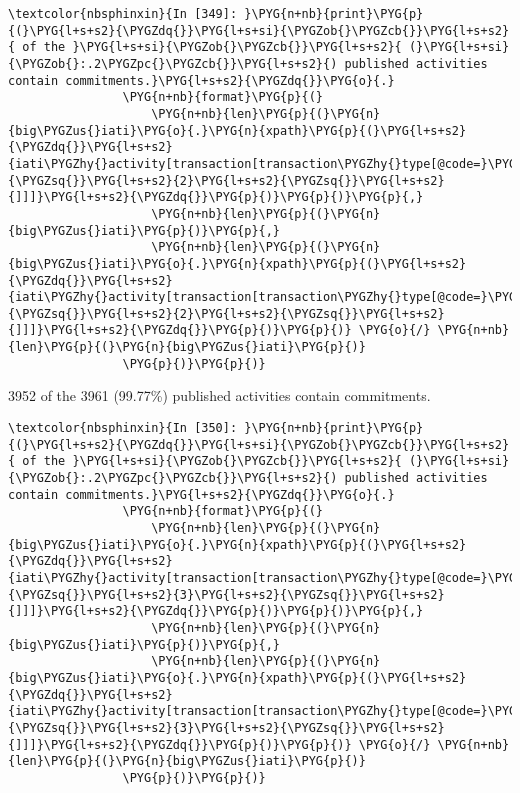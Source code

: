 \documentclass[letterpaper,10pt,english]{sphinxmanual}
\begin{document}
\begin{Verbatim}[commandchars=\\\{\}]
\textcolor{nbsphinxin}{In [349]: }\PYG{n+nb}{print}\PYG{p}{(}\PYG{l+s+s2}{\PYGZdq{}}\PYG{l+s+si}{\PYGZob{}\PYGZcb{}}\PYG{l+s+s2}{ of the }\PYG{l+s+si}{\PYGZob{}\PYGZcb{}}\PYG{l+s+s2}{ (}\PYG{l+s+si}{\PYGZob{}:.2\PYGZpc{}\PYGZcb{}}\PYG{l+s+s2}{) published activities contain commitments.}\PYG{l+s+s2}{\PYGZdq{}}\PYG{o}{.}
                \PYG{n+nb}{format}\PYG{p}{(}
                    \PYG{n+nb}{len}\PYG{p}{(}\PYG{n}{big\PYGZus{}iati}\PYG{o}{.}\PYG{n}{xpath}\PYG{p}{(}\PYG{l+s+s2}{\PYGZdq{}}\PYG{l+s+s2}{iati\PYGZhy{}activity[transaction[transaction\PYGZhy{}type[@code=}\PYG{l+s+s2}{\PYGZsq{}}\PYG{l+s+s2}{2}\PYG{l+s+s2}{\PYGZsq{}}\PYG{l+s+s2}{]]]}\PYG{l+s+s2}{\PYGZdq{}}\PYG{p}{)}\PYG{p}{)}\PYG{p}{,}
                    \PYG{n+nb}{len}\PYG{p}{(}\PYG{n}{big\PYGZus{}iati}\PYG{p}{)}\PYG{p}{,}
                    \PYG{n+nb}{len}\PYG{p}{(}\PYG{n}{big\PYGZus{}iati}\PYG{o}{.}\PYG{n}{xpath}\PYG{p}{(}\PYG{l+s+s2}{\PYGZdq{}}\PYG{l+s+s2}{iati\PYGZhy{}activity[transaction[transaction\PYGZhy{}type[@code=}\PYG{l+s+s2}{\PYGZsq{}}\PYG{l+s+s2}{2}\PYG{l+s+s2}{\PYGZsq{}}\PYG{l+s+s2}{]]]}\PYG{l+s+s2}{\PYGZdq{}}\PYG{p}{)}\PYG{p}{)} \PYG{o}{/} \PYG{n+nb}{len}\PYG{p}{(}\PYG{n}{big\PYGZus{}iati}\PYG{p}{)}
                \PYG{p}{)}\PYG{p}{)}
\end{Verbatim}
%
\begin{OriginalVerbatim}[commandchars=\\\{\}]
3952 of the 3961 (99.77\%) published activities contain commitments.
\end{OriginalVerbatim}
\relax
\begin{Verbatim}[commandchars=\\\{\}]
\textcolor{nbsphinxin}{In [350]: }\PYG{n+nb}{print}\PYG{p}{(}\PYG{l+s+s2}{\PYGZdq{}}\PYG{l+s+si}{\PYGZob{}\PYGZcb{}}\PYG{l+s+s2}{ of the }\PYG{l+s+si}{\PYGZob{}\PYGZcb{}}\PYG{l+s+s2}{ (}\PYG{l+s+si}{\PYGZob{}:.2\PYGZpc{}\PYGZcb{}}\PYG{l+s+s2}{) published activities contain commitments.}\PYG{l+s+s2}{\PYGZdq{}}\PYG{o}{.}
                \PYG{n+nb}{format}\PYG{p}{(}
                    \PYG{n+nb}{len}\PYG{p}{(}\PYG{n}{big\PYGZus{}iati}\PYG{o}{.}\PYG{n}{xpath}\PYG{p}{(}\PYG{l+s+s2}{\PYGZdq{}}\PYG{l+s+s2}{iati\PYGZhy{}activity[transaction[transaction\PYGZhy{}type[@code=}\PYG{l+s+s2}{\PYGZsq{}}\PYG{l+s+s2}{3}\PYG{l+s+s2}{\PYGZsq{}}\PYG{l+s+s2}{]]]}\PYG{l+s+s2}{\PYGZdq{}}\PYG{p}{)}\PYG{p}{)}\PYG{p}{,}
                    \PYG{n+nb}{len}\PYG{p}{(}\PYG{n}{big\PYGZus{}iati}\PYG{p}{)}\PYG{p}{,}
                    \PYG{n+nb}{len}\PYG{p}{(}\PYG{n}{big\PYGZus{}iati}\PYG{o}{.}\PYG{n}{xpath}\PYG{p}{(}\PYG{l+s+s2}{\PYGZdq{}}\PYG{l+s+s2}{iati\PYGZhy{}activity[transaction[transaction\PYGZhy{}type[@code=}\PYG{l+s+s2}{\PYGZsq{}}\PYG{l+s+s2}{3}\PYG{l+s+s2}{\PYGZsq{}}\PYG{l+s+s2}{]]]}\PYG{l+s+s2}{\PYGZdq{}}\PYG{p}{)}\PYG{p}{)} \PYG{o}{/} \PYG{n+nb}{len}\PYG{p}{(}\PYG{n}{big\PYGZus{}iati}\PYG{p}{)}
                \PYG{p}{)}\PYG{p}{)}
\end{Verbatim}
\end{document}

